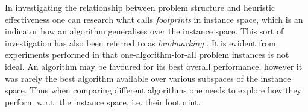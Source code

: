 \documentclass[10pt]{llncs} %
\newcommand{\good}{\emph{good} }
\newcommand{\bad}{\emph{bad} }
\begin{document}

In investigating the relationship between problem structure and heuristic effectiveness one can research what \cite{Corne2011} calls \emph{footprints} in instance space, which is an indicator how an algorithm generalises over the instance space. This sort of investigation has also been referred to as \emph{landmarking} \cite{Pfahringer2000}. 
It is evident from experiments performed in \cite{Corne2011} that one-algorithm-for-all problem instances is not ideal. An algorithm may be favoured for its best overall performance, however it was rarely the best algorithm available over various subspaces of the instance space.
Thus when comparing different algorithms one needs to explore how they perform w.r.t. the instance space, i.e. their footprint. %
\end{document}
